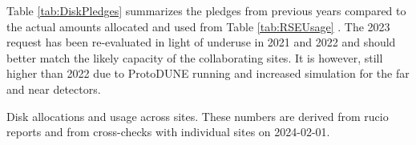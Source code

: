 \documentclass[12pt]{article}
\begin{document}
Table \ref{tab:DiskPledges} summarizes the pledges from previous years compared to the actual amounts allocated and used from Table \ref{tab:RSEUsage} .   The 2023 request has been re-evaluated in light of underuse in 2021 and 2022 and should better match the likely capacity of the collaborating sites.  It is however, still higher than 2022 due to ProtoDUNE running and increased simulation for the far and near detectors. 

\begin{table}[ht]
\centering
{}
\caption{Disk allocations and usage across sites.    These numbers are derived from rucio reports and from cross-checks with individual sites on 2024-02-01. }
\label{tab:RSEUsage}
\end{table}
\end{document}
